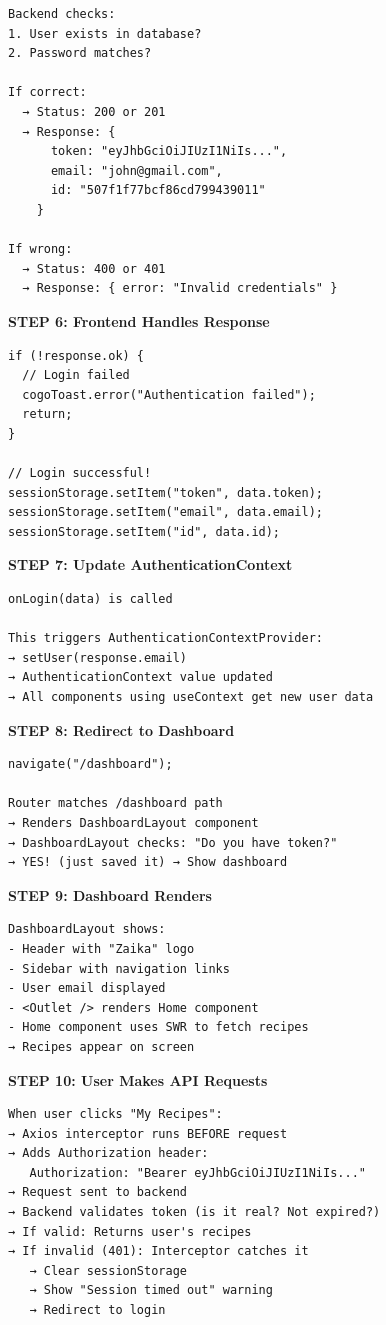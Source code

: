 \documentclass[12pt]{article}
\begin{document}
\begin{lstlisting}
Backend checks:
1. User exists in database?
2. Password matches?

If correct:
  → Status: 200 or 201
  → Response: {
      token: "eyJhbGciOiJIUzI1NiIs...",
      email: "john@gmail.com",
      id: "507f1f77bcf86cd799439011"
    }

If wrong:
  → Status: 400 or 401
  → Response: { error: "Invalid credentials" }
\end{lstlisting}

\textbf{STEP 6: Frontend Handles Response}

\begin{lstlisting}
if (!response.ok) {
  // Login failed
  cogoToast.error("Authentication failed");
  return;
}

// Login successful!
sessionStorage.setItem("token", data.token);
sessionStorage.setItem("email", data.email);
sessionStorage.setItem("id", data.id);
\end{lstlisting}

\textbf{STEP 7: Update AuthenticationContext}

\begin{lstlisting}
onLogin(data) is called

This triggers AuthenticationContextProvider:
→ setUser(response.email)
→ AuthenticationContext value updated
→ All components using useContext get new user data
\end{lstlisting}

\textbf{STEP 8: Redirect to Dashboard}

\begin{lstlisting}
navigate("/dashboard");

Router matches /dashboard path
→ Renders DashboardLayout component
→ DashboardLayout checks: "Do you have token?"
→ YES! (just saved it) → Show dashboard
\end{lstlisting}

\textbf{STEP 9: Dashboard Renders}

\begin{lstlisting}
DashboardLayout shows:
- Header with "Zaika" logo
- Sidebar with navigation links
- User email displayed
- <Outlet /> renders Home component
- Home component uses SWR to fetch recipes
→ Recipes appear on screen
\end{lstlisting}

\textbf{STEP 10: User Makes API Requests}

\begin{lstlisting}
When user clicks "My Recipes":
→ Axios interceptor runs BEFORE request
→ Adds Authorization header:
   Authorization: "Bearer eyJhbGciOiJIUzI1NiIs..."
→ Request sent to backend
→ Backend validates token (is it real? Not expired?)
→ If valid: Returns user's recipes
→ If invalid (401): Interceptor catches it
   → Clear sessionStorage
   → Show "Session timed out" warning
   → Redirect to login
\end{lstlisting}
\end{document}
